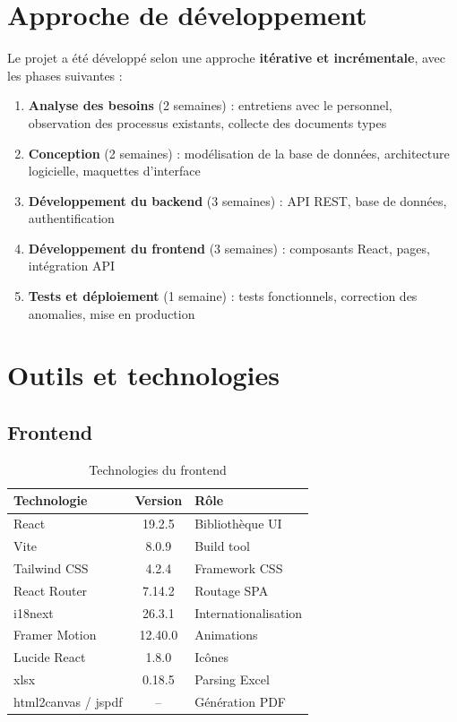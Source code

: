 \documentclass[12pt,a4paper]{report}
\begin{document}
\section{Approche de développement}

Le projet a été développé selon une approche \textbf{itérative et incrémentale}, avec les phases suivantes :

\begin{enumerate}
    \item \textbf{Analyse des besoins} (2 semaines) : entretiens avec le personnel, observation des processus existants, collecte des documents types
    \item \textbf{Conception} (2 semaines) : modélisation de la base de données, architecture logicielle, maquettes d'interface
    \item \textbf{Développement du backend} (3 semaines) : API REST, base de données, authentification
    \item \textbf{Développement du frontend} (3 semaines) : composants React, pages, intégration API
    \item \textbf{Tests et déploiement} (1 semaine) : tests fonctionnels, correction des anomalies, mise en production
\end{enumerate}

\section{Outils et technologies}

\subsection*{Frontend}
\begin{table}[H]
\centering
\caption{Technologies du frontend}
\label{tab:frontend-tech}
\begin{tabularx}{\textwidth}{lcl}
\toprule
\textbf{Technologie} & \textbf{Version} & \textbf{Rôle} \\
\midrule
React & 19.2.5 & Bibliothèque UI \\
Vite & 8.0.9 & Build tool \\
Tailwind CSS & 4.2.4 & Framework CSS \\
React Router & 7.14.2 & Routage SPA \\
i18next & 26.3.1 & Internationalisation \\
Framer Motion & 12.40.0 & Animations \\
Lucide React & 1.8.0 & Icônes \\
xlsx & 0.18.5 & Parsing Excel \\
html2canvas / jspdf & -- & Génération PDF \\
\bottomrule
\end{tabularx}
\end{table}
\end{document}
